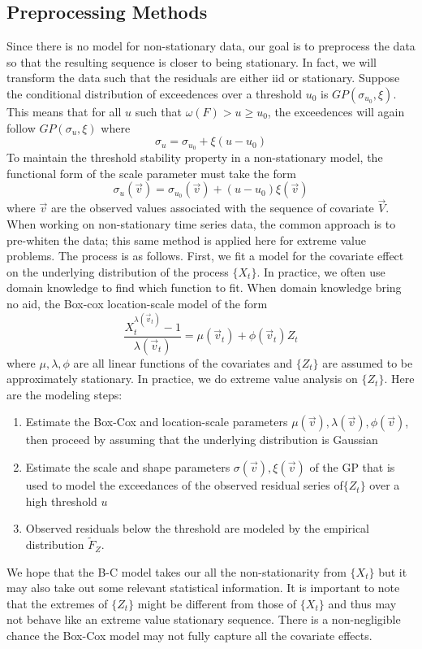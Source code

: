 \documentclass{article}
\theoremstyle{definition}
\theoremstyle{definition}
\def\v{\vec{v}}
\def\V{\Vec{V}}
\begin{document}
\subsection{Preprocessing Methods}
Since there is no model for non-stationary data, our goal is to preprocess the data so that the resulting sequence is closer to being stationary. In fact, we will transform the data such that the residuals are either iid or stationary. Suppose the conditional distribution of exceedences over a threshold $u_0$ is $GP(\sigma_{u_0},\xi)$. This means that for all $u$ such that $\omega(F)>u\geq u_0$, the exceedences will again follow $GP(\sigma_u, \xi)$ where 
\[\sigma_u=\sigma_{u_0} +\xi (u-u_0)\]
To maintain the threshold stability property in a non-stationary model, the functional form of the scale parameter must take the form
\[\sigma_u(\v)=\sigma_{u_0}(\v)+(u-u_0)\xi(\v)\]
where $\v$ are the observed values associated with the sequence of covariate $\V$. When working on non-stationary time series data, the common approach is to pre-whiten the data; this same method is applied here for extreme value problems. The process is as follows. First, we fit a model for the covariate effect on the underlying distribution of the process $\{X_t\}$. In practice, we often use domain knowledge to find which function to fit. When domain knowledge bring no aid, the Box-cox location-scale model of the form 
\[\frac{X_t^{\lambda(\v_t)}-1}{\lambda(\v_t)}= \mu(\v_t)+\phi(\v_t)Z_t\]
where $\mu, \lambda, \phi$ are all linear functions of the covariates and $\{Z_t\}$ are assumed to be approximately stationary. In practice, we do extreme value analysis on $\{Z_t\}$. Here are the modeling steps:
\begin{enumerate}
    \item Estimate the Box-Cox and location-scale parameters $\mu(\v), \lambda(\v), \phi(\v)$, then proceed by assuming that the underlying distribution is Gaussian
    \item Estimate the scale and shape parameters $\sigma(\v), \xi(\v)$ of the  GP that is used to model the exceedances of the observed residual series of$\{Z_t\}$ over a high threshold $u$
    \item  Observed residuals below the threshold are modeled by the empirical distribution $\tilde{F}_Z$.
\end{enumerate}We hope that the B-C model takes our all the non-stationarity from $\{X_t\}$ but it may also take out some relevant statistical information. It is important to note that the extremes of $\{Z_t\}$ might be different from those of $\{X_t\}$ and thus may not behave like an extreme value stationary sequence. There is a non-negligible chance the Box-Cox model may not fully capture all the covariate effects.
\end{document}
